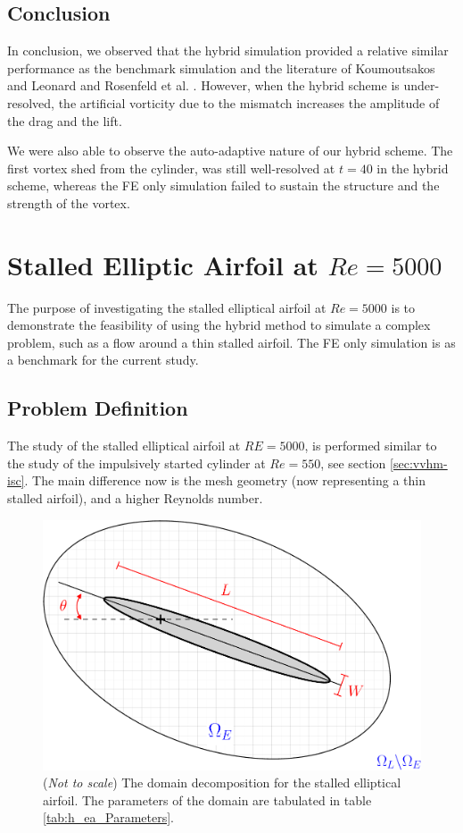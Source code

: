 \subsection{Conclusion}	

In conclusion, we observed that the hybrid simulation provided a relative similar performance as the benchmark simulation and the literature of  Koumoutsakos and Leonard \cite{Koumoutsakos1995a} and Rosenfeld et al. \cite{MosheRosenFeldDochanKwak1991}. However, when the hybrid scheme is under-resolved, the artificial vorticity due to the mismatch increases the amplitude of the drag and the lift.

We were also able to observe the auto-adaptive nature of our hybrid scheme. The first vortex shed from the cylinder, was still well-resolved at $t=40$ in the hybrid scheme, whereas the FE only simulation failed to sustain the structure and the strength of the vortex.

\section{Stalled Elliptic Airfoil at $Re=5000$}
\label{sec:vvhm-ea}

The purpose of investigating the stalled elliptical airfoil at $Re=5000$ is to demonstrate the feasibility of using the hybrid method to simulate a complex problem, such as a flow around a thin stalled airfoil. The FE only simulation is as a benchmark for the current study.

\subsection{Problem Definition}

The study of the stalled elliptical airfoil at $RE=5000$, is performed similar to the study of the impulsively started cylinder at $Re=550$, see section \ref{sec:vvhm-isc}. The main difference now is the mesh geometry (now representing a thin stalled airfoil), and a higher Reynolds number.

	\begin{figure}[!b]
	\centering
	\includegraphics[width=0.6\linewidth]{./figures/validation/ellipse/hellipticAirfoil_dd-crop.pdf}
	\caption{(\textit{Not to scale}) The domain decomposition for the stalled elliptical airfoil. The parameters of the domain are tabulated in table \ref{tab:h_ea_Parameters}.}
	\label{fig:hellipticAirfoil_dd-crop}
	\end{figure}

